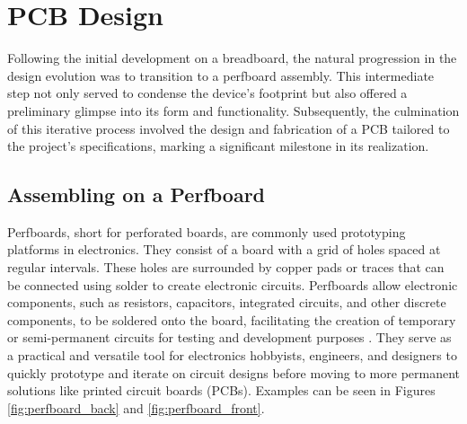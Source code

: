 \chapter{PCB Design}
\label{cap:pcbdesign}

Following the initial development on a breadboard, the natural progression in the design evolution was to 
transition to a perfboard assembly. This intermediate step not only served to condense the device's 
footprint but also offered a preliminary glimpse into its form and functionality. Subsequently, the 
culmination of this iterative process involved the design and fabrication of a PCB tailored to the 
project's specifications, marking a significant milestone in its realization.


\section{Assembling on a Perfboard}

Perfboards, short for perforated boards, are commonly used prototyping platforms in electronics. They 
consist of a board with a grid of holes spaced at regular intervals. These holes are surrounded by copper 
pads or traces that can be connected using solder to create electronic circuits. Perfboards allow 
electronic components, such as resistors, capacitors, integrated circuits, and other discrete components, 
to be soldered onto the board, facilitating the creation of temporary or semi-permanent circuits for 
testing and development purposes \cite{perfboard}. They serve as a practical and versatile tool for 
electronics hobbyists, engineers, and designers to quickly prototype and iterate on circuit designs 
before moving to more permanent solutions like printed circuit boards (PCBs). Examples can be seen in 
Figures \ref{fig:perfboard_back} and \ref{fig:perfboard_front}.

